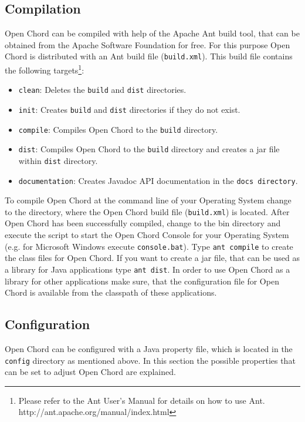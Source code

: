 \subsection{Compilation}
Open Chord can be compiled with help of the Apache Ant build tool, that can be obtained 
from the Apache Software Foundation for free. For this purpose Open Chord is 
distributed with an Ant build file ({\tt build.xml}). This build file contains the 
following targets\footnote{Please refer to the Ant User's Manual for details on how to use Ant. http://ant.apache.org/manual/index.html}: 
\vspace{-0.5cm}
\begin{itemize}
\setlength\itemsep{-1ex}
\item {\tt clean}: Deletes the {\tt build} and {\tt dist} directories.
\item {\tt init}: Creates {\tt build} and {\tt dist} directories if they do not exist. 
\item {\tt compile}: Compiles Open Chord to the {\tt build} directory. 
\item {\tt dist}: Compiles Open Chord to the {\tt build} directory and creates a 
jar file within {\tt dist} directory. 
\item {\tt documentation}: Creates Javadoc API documentation in the {\tt docs directory}. 
\end{itemize}
\vspace{-0.5cm}
To compile Open Chord at the command line of your Operating System change to the directory, where the Open Chord build file ({\tt build.xml}) is located. 
After Open Chord has been successfully compiled, change to the bin directory and 
execute the script to start the Open Chord Console for your Operating System (e.g. for Microsoft Windows execute {\tt console.bat}). 
Type {\tt ant compile} to create the class files for Open Chord. If you want to create a jar file, that can be used as a library for Java applications type {\tt ant dist}. 
In order to use Open Chord as a library for other applications make sure, that the configuration file for Open Chord is available from the classpath of these applications. 

\subsection{Configuration}\label{config} 
Open Chord can be configured with a Java property file, which is located in the {\tt config} directory as mentioned above. In this section the possible properties that can 
be set to adjust Open Chord are explained. 

